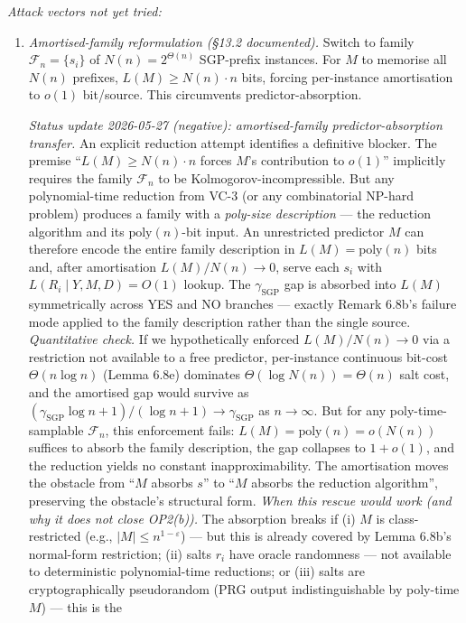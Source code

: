 \documentclass[
]{article}
\begin{document}
\emph{Attack vectors not yet tried:}
\begin{enumerate}
\item \emph{Amortised-family reformulation (§13.2 documented).}
Switch to family $\mathcal{F}_n = \{s_i\}$ of $N(n) = 2^{\Theta(n)}$
SGP-prefix instances. For $M$ to memorise all $N(n)$ prefixes,
$L(M) \geq N(n) \cdot n$ bits, forcing per-instance amortisation to
$o(1)$ bit/source. This circumvents predictor-absorption.

\emph{Status update 2026-05-27 (negative): amortised-family
predictor-absorption transfer.} An explicit reduction attempt
identifies a definitive blocker. The premise ``$L(M) \geq N(n)
\cdot n$ forces $M$'s contribution to $o(1)$'' implicitly requires
the family $\mathcal{F}_n$ to be Kolmogorov-incompressible. But any
polynomial-time reduction from VC-3 (or any combinatorial NP-hard
problem) produces a family with a \emph{poly-size description} ---
the reduction algorithm and its $\mathrm{poly}(n)$-bit input. An
unrestricted predictor $M$ can therefore encode the entire family
description in $L(M) = \mathrm{poly}(n)$ bits and, after
amortisation $L(M)/N(n) \to 0$, serve each $s_i$ with
$L(R_i \mid Y, M, D) = O(1)$ lookup. The $\gamma_{\mathrm{SGP}}$
gap is absorbed into $L(M)$ symmetrically across YES and NO
branches --- exactly Remark 6.8b's failure mode applied to the
family description rather than the single source. \emph{Quantitative
check.} If we hypothetically enforced $L(M)/N(n) \to 0$ via a
restriction not available to a free predictor, per-instance
continuous bit-cost $\Theta(n \log n)$ (Lemma 6.8e) dominates
$\Theta(\log N(n)) = \Theta(n)$ salt cost, and the amortised gap
would survive as
$(\gamma_{\mathrm{SGP}} \log n + 1)/(\log n + 1) \to \gamma_{\mathrm{SGP}}$
as $n \to \infty$. But for any poly-time-samplable
$\mathcal{F}_n$, this enforcement fails: $L(M) = \mathrm{poly}(n)
= o(N(n))$ suffices to absorb the family description, the gap
collapses to $1 + o(1)$, and the reduction yields no constant
inapproximability. The amortisation moves the obstacle from ``$M$
absorbs $s$'' to ``$M$ absorbs the reduction algorithm'',
preserving the obstacle's structural form. \emph{When this rescue
would work (and why it does not close OP2(b)).} The absorption
breaks if (i) $M$ is class-restricted (e.g., $|M| \leq
n^{1-\varepsilon}$) --- but this is already covered by Lemma
6.8b's normal-form restriction; (ii) salts $r_i$ have oracle
randomness --- not available to deterministic polynomial-time
reductions; or (iii) salts are cryptographically pseudorandom (PRG
output indistinguishable by poly-time $M$) --- this is the

\end{enumerate}
\end{document}
